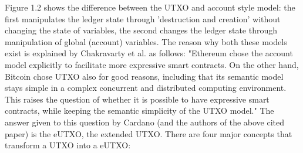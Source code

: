 \documentclass[a4paper,twoside,12pt]{report}
\begin{document}
Figure 1.2 shows the difference between the UTXO and account style model: the first manipulates the ledger state through 'destruction and creation' without changing the state of variables, the second changes the ledger state through manipulation of global (account) variables. The reason why both these models exist is explained by Chakravarty et al. \cite{DBLP:conf/fc/Chakravarty0MMJ20} as follows: "Ethereum chose the account model explicitly to facilitate more expressive smart contracts. On the other hand, Bitcoin chose UTXO also for good reasons, including that its semantic model stays simple in a complex concurrent and distributed computing environment. This raises the question of whether it is possible to have expressive smart contracts, while keeping the semantic simplicity of the UTXO model." The answer given to this question by Cardano (and the authors of the above cited paper) is the eUTXO, the extended UTXO. There are four major concepts that transform a UTXO into a eUTXO:  
\end{document}
